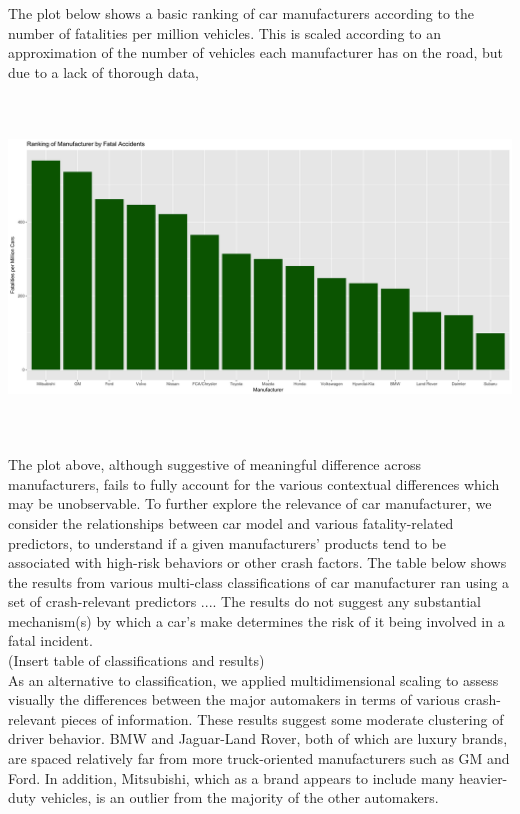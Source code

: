 \documentclass[11pt, oneside]{article}   	%
\begin{document}
The plot below shows a basic ranking of car manufacturers according to the number of fatalities per million vehicles. This is scaled according to an approximation of the number of vehicles each manufacturer has on the road, but due to a lack of thorough data, 
\\
\begin{center}
\includegraphics[width=.75\textwidth,height=9cm,keepaspectratio]{ManufacturerRankingPlot.png}
\end{center}


The plot above, although suggestive of meaningful difference across manufacturers, fails to fully account for the various contextual differences which may be unobservable. To further explore the relevance of car manufacturer, we consider the relationships between car model and various fatality-related predictors, to understand if a given manufacturers' products tend to be associated with high-risk behaviors or other crash factors. The table below shows the results from various multi-class classifications of car manufacturer ran using a set of crash-relevant predictors .... The results do not suggest any substantial mechanism(s) by which a car's make determines the risk of it being involved in a fatal incident. \\

(Insert table of classifications and results) \\

As an alternative to classification, we applied multidimensional scaling to assess visually the differences between the major automakers in terms of various crash-relevant pieces of information. These results suggest some moderate clustering of driver behavior. BMW and Jaguar-Land Rover, both of which are luxury brands, are spaced relatively far from more truck-oriented manufacturers such as GM and Ford. In addition, Mitsubishi, which as a brand appears to include many heavier-duty vehicles, is an outlier from the majority of the other automakers.\\
\end{document}
